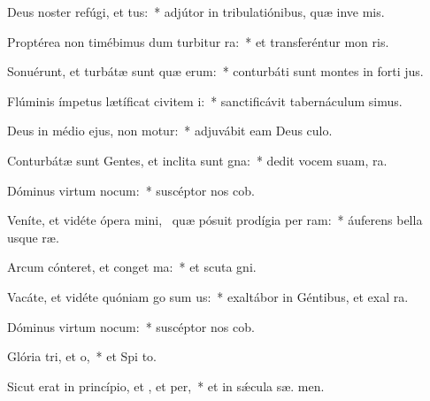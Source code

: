 \item Deus noster refúgi, et tus:~* adjútor in tribulatiónibus, quæ inve  mis.
\item Proptérea non timébimus dum turbitur ra:~* et transferéntur mon   ris.
\item Sonuérunt, et turbátæ sunt quæ erum:~* conturbáti sunt montes in forti jus.
\item Flúminis ímpetus lætíficat civitem i:~* sanctificávit tabernáculum  simus.
\item Deus in médio ejus, non motur:~* adjuvábit eam Deus  culo.
\item Conturbátæ sunt Gentes, et inclita sunt gna:~* dedit vocem suam,   ra.
\item Dóminus virtum nocum:~* suscéptor nos  cob.
\item Veníte, et vidéte ópera mini,~\pscross{} quæ pósuit prodígia per ram:~* áuferens bella usque   ræ.
\item Arcum cónteret, et conget ma:~* et scuta  gni.
\item Vacáte, et vidéte quóniam go sum us:~* exaltábor in Géntibus, et exal  ra.
\item Dóminus virtum nocum:~* suscéptor nos  cob.
\item Glória tri, et o,~* et Spi to.
\item Sicut erat in princípio, et , et per,~* et in sǽcula sæ. men.
